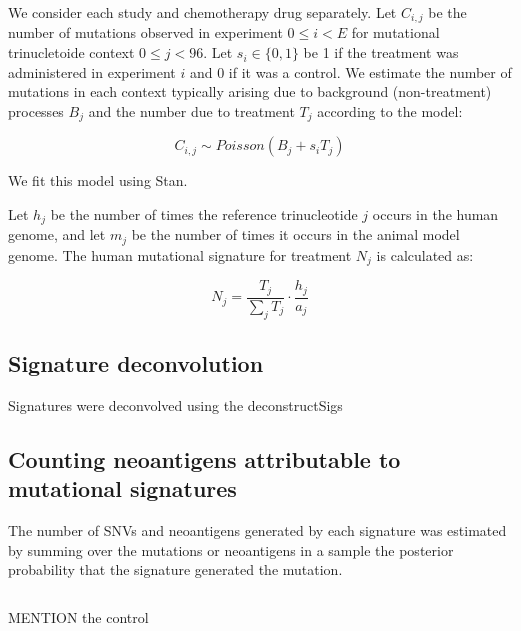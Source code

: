 We consider each study and chemotherapy drug separately. Let $C_{i,j}$ be the number of mutations observed in experiment $0 \leq i \lt E$ for mutational trinucletoide context $0 \leq j \lt 96$. Let $s_i \in \{0,1\}$ be 1 if the treatment was administered in experiment $i$ and 0 if it was a control. We estimate the number of mutations in each context typically arising due to background (non-treatment) processes $B_j$ and the number due to treatment $T_j$ according to the model:

\[
C_{i,j} \sim \mathit{Poisson}(B_j + s_i T_j)
\]

We fit this model using Stan\cite{Gelman_2015}.

Let $h_j$ be the number of times the reference trinucleotide $j$ occurs in the human genome, and let $m_j$ be the number of times it occurs in the animal model genome. The human mutational signature for treatment $N_j$ is calculated as:

\[
N_j = \frac{T_j}{\sum_j{T_j}} \cdot \frac{h_j}{a_j}
\]


\subsection*{Signature deconvolution}
Signatures were deconvolved using the deconstructSigs\cite{Rosenthal_2016}

\subsection*{Counting neoantigens attributable to mutational signatures}
The number of SNVs and neoantigens generated by each signature was estimated by summing over the mutations or neoantigens in a sample the posterior probability that the signature generated the mutation.

\[



\]


MENTION the control



